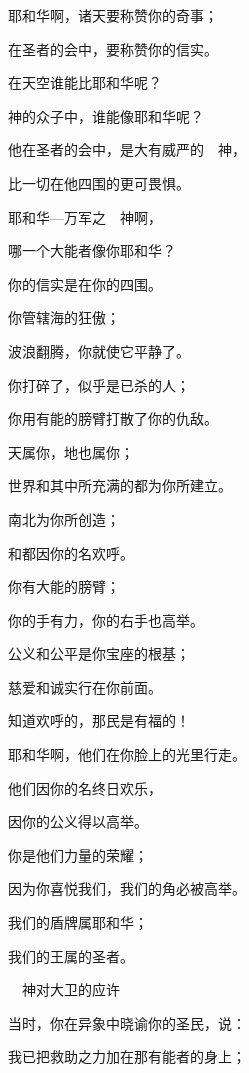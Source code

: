 {\BB \par }{\Q {}耶和华啊，诸天要称赞你的奇事；
\par }{\Q 在圣者的会中，要称赞你的信实。
\par }{\Q {}在天空谁能比耶和华呢？
\par }{\Q 神的众子中，谁能像耶和华呢？
\par }{\Q {}他在圣者的会中，是大有威严的　神，
\par }{\Q 比一切在他四围的更可畏惧。
\par }{\Q {}耶和华—万军之　神啊，
\par }{\Q 哪一个大能者像你耶和华？
\par }{\Q 你的信实是在你的四围。
\par }{\Q {}你管辖海的狂傲；
\par }{\Q 波浪翻腾，你就使它平静了。
\par }{\Q {}你打碎了{}，似乎是已杀的人；
\par }{\Q 你用有能的膀臂打散了你的仇敌。
\par }{\Q {}天属你，地也属你；
\par }{\Q 世界和其中所充满的都为你所建立。
\par }{\Q {}南北为你所创造；
\par }{和{}都因你的名欢呼。
\par }{\Q {}你有大能的膀臂；
\par }{\Q 你的手有力，你的右手也高举。
\par }{\Q {}公义和公平是你宝座的根基；
\par }{\Q 慈爱和诚实行在你前面。
\par }{\BB \par }{\Q {}知道{}欢呼的，那民是有福的！
\par }{\Q 耶和华啊，他们在你脸上的光里行走。
\par }{\Q {}他们因你的名终日欢乐，
\par }{\Q 因你的公义得以高举。
\par }{\Q {}你是他们力量的荣耀；
\par }{\Q 因为你喜悦我们，我们的角必被高举。
\par }{\Q {}我们的盾牌属耶和华；
\par }{\Q 我们的王属{}的圣者。
\par }{\SH 　神对大卫的应许
\par }{\Q {}当时，你在异象中晓谕你的圣民，说：
\par }{\Q 我已把救助之力加在那有能者的身上；
}
